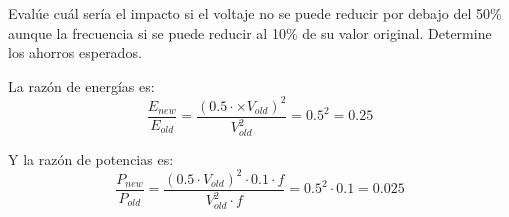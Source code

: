 \begin{acexercise}
\end{acexercise}

Evalúe cuál sería el impacto si el voltaje no se puede reducir por debajo del 50\%
aunque la frecuencia si se puede reducir al 10\% de su valor original.
Determine los ahorros esperados.

\begin{acsolution}
\end{acsolution}

La razón de energías es:
\[
\frac{E_{new}}{E_{old}} =
\frac{(0.5 \cdot \times V_{old})^2}{V_{old}^2} =
0.5^2 =
0.25
\] 

Y la razón de potencias es:
\[
\frac{P_{new}}{P_{old}} =
\frac{(0.5 \cdot V_{old})^2 \cdot 0.1 \cdot f}{V_{old}^2 \cdot f} =
0.5^2 \cdot 0.1 =
0.025
\]
